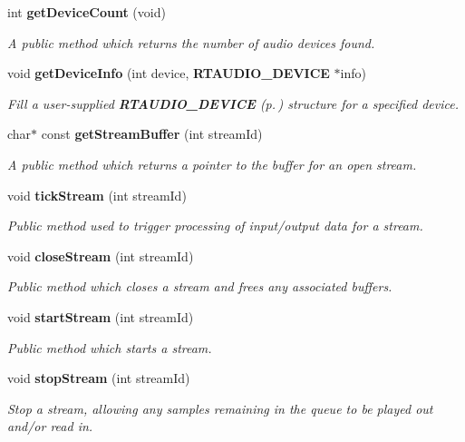 \begin{CompactItemize}
int {\bf get\-Device\-Count} (void)
\begin{CompactList}\small\item\em A public method which returns the number of audio devices found.\item\end{CompactList}\item 
void {\bf get\-Device\-Info} (int device, {\bf RTAUDIO\_\-DEVICE} $\ast$info)
\begin{CompactList}\small\item\em Fill a user-supplied {\bf RTAUDIO\_\-DEVICE} {\rm (p.\,\pageref{structRtAudio_1_1RTAUDIO__DEVICE})} structure for a specified device.\item\end{CompactList}\item 
char$\ast$ const {\bf get\-Stream\-Buffer} (int stream\-Id)
\begin{CompactList}\small\item\em A public method which returns a pointer to the buffer for an open stream.\item\end{CompactList}\item 
void {\bf tick\-Stream} (int stream\-Id)
\begin{CompactList}\small\item\em Public method used to trigger processing of input/output data for a stream.\item\end{CompactList}\item 
void {\bf close\-Stream} (int stream\-Id)
\begin{CompactList}\small\item\em Public method which closes a stream and frees any associated buffers.\item\end{CompactList}\item 
void {\bf start\-Stream} (int stream\-Id)
\begin{CompactList}\small\item\em Public method which starts a stream.\item\end{CompactList}\item 
void {\bf stop\-Stream} (int stream\-Id)
\begin{CompactList}\small\item\em Stop a stream, allowing any samples remaining in the queue to be played out and/or read in.\item\end{CompactList}\item 

\end{CompactItemize}
